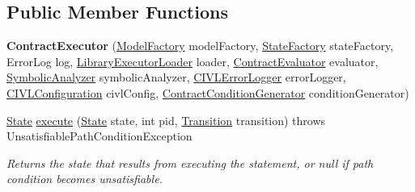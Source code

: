 \subsection*{Public Member Functions}
\begin{DoxyCompactItemize}
\item 
\hypertarget{classedu_1_1udel_1_1cis_1_1vsl_1_1civl_1_1semantics_1_1contract_1_1ContractExecutor_a7d5b351fe40ec72e2f2dc7942b76427f}{}{\bfseries Contract\+Executor} (\hyperlink{interfaceedu_1_1udel_1_1cis_1_1vsl_1_1civl_1_1model_1_1IF_1_1ModelFactory}{Model\+Factory} model\+Factory, \hyperlink{interfaceedu_1_1udel_1_1cis_1_1vsl_1_1civl_1_1state_1_1IF_1_1StateFactory}{State\+Factory} state\+Factory, Error\+Log log, \hyperlink{interfaceedu_1_1udel_1_1cis_1_1vsl_1_1civl_1_1semantics_1_1IF_1_1LibraryExecutorLoader}{Library\+Executor\+Loader} loader, \hyperlink{classedu_1_1udel_1_1cis_1_1vsl_1_1civl_1_1semantics_1_1contract_1_1ContractEvaluator}{Contract\+Evaluator} evaluator, \hyperlink{interfaceedu_1_1udel_1_1cis_1_1vsl_1_1civl_1_1semantics_1_1IF_1_1SymbolicAnalyzer}{Symbolic\+Analyzer} symbolic\+Analyzer, \hyperlink{classedu_1_1udel_1_1cis_1_1vsl_1_1civl_1_1log_1_1IF_1_1CIVLErrorLogger}{C\+I\+V\+L\+Error\+Logger} error\+Logger, \hyperlink{classedu_1_1udel_1_1cis_1_1vsl_1_1civl_1_1config_1_1IF_1_1CIVLConfiguration}{C\+I\+V\+L\+Configuration} civl\+Config, \hyperlink{interfaceedu_1_1udel_1_1cis_1_1vsl_1_1civl_1_1semantics_1_1IF_1_1ContractConditionGenerator}{Contract\+Condition\+Generator} condition\+Generator)\label{classedu_1_1udel_1_1cis_1_1vsl_1_1civl_1_1semantics_1_1contract_1_1ContractExecutor_a7d5b351fe40ec72e2f2dc7942b76427f}

\item 
\hyperlink{interfaceedu_1_1udel_1_1cis_1_1vsl_1_1civl_1_1state_1_1IF_1_1State}{State} \hyperlink{classedu_1_1udel_1_1cis_1_1vsl_1_1civl_1_1semantics_1_1contract_1_1ContractExecutor_a751e0341eabb8965b544dd0f1cdfa26e}{execute} (\hyperlink{interfaceedu_1_1udel_1_1cis_1_1vsl_1_1civl_1_1state_1_1IF_1_1State}{State} state, int pid, \hyperlink{interfaceedu_1_1udel_1_1cis_1_1vsl_1_1civl_1_1semantics_1_1IF_1_1Transition}{Transition} transition)  throws Unsatisfiable\+Path\+Condition\+Exception 
\begin{DoxyCompactList}\small\item\em Returns the state that results from executing the statement, or null if path condition becomes unsatisfiable. \end{DoxyCompactList}\end{DoxyCompactItemize}

